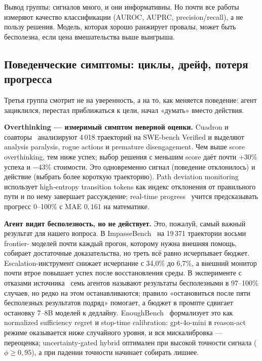 \documentclass[11pt,a4paper]{article}
\begin{document}
Вывод группы: сигналов много, и они информативны. Но почти все работы
измеряют качество классификации (AUROC, AUPRC, precision/recall), а не
пользу решения. Модель, которая хорошо ранжирует провалы, может быть
бесполезна, если цена вмешательства выше выигрыша.

\subsection{Поведенческие симптомы: циклы, дрейф, потеря прогресса}

Третья группа смотрит не на уверенность, а на то, как меняется поведение:
агент зациклился, перестал приближаться к цели, начал «думать» вместо
действия.

\textbf{Overthinking — измеримый симптом неверной оценки.}
Cuadron и соавторы~\cite{cuadron2025overthinking} анализируют 4\,018
траекторий на SWE-bench Verified и выделяют analysis paralysis, rogue
actions и premature disengagement. Чем выше score overthinking, тем ниже
успех; выбор решения с меньшим score даёт почти +30\% успеха и −43\%
стоимости. Это одновременно сигнал (поведение отклонилось) и действие
(выбрать более короткую траекторию). Path deviation
monitoring~\cite{guan2026deviation} использует high-entropy transition
tokens как индекс отклонения от правильного пути и по нему завершает
рассуждение; real-time progress~\cite{raaschou2025progress} учится
предсказывать прогресс 0--100\% с MAE $0{,}161$ на математике.

\textbf{Агент видит бесполезность, но не действует.}
Это, пожалуй, самый важный результат для нашего вопроса. В
ImpasseBench~\cite{chen2026stop} на 19\,371 траектории восьми frontier-
моделей почти каждый прогон, которому нужна внешняя помощь, собирает
достаточные доказательства, но треть всё равно исчерпывает бюджет.
Escalation-инструмент снижает исчерпание с 34{,}0\% до 6{,}7\%, а внешний
монитор почти втрое повышает успех после восстановления среды. В
эксперименте с отказами источника~\cite{zhang2026judged} семь агентов
называют результаты бесполезными в 97--100\% случаев, но редко на этом
останавливаются; правило «остановиться после пяти бесполезных результатов
подряд» помогает, а бюджет в промпте сдвигает остановку 7--8B моделей к
дедлайну. EnoughBench~\cite{almamoori2026enough} формализует это как
normalized sufficiency regret и stop-time calibration: gpt-4o-mini в
reason-act режиме оказывается ниже случайного уровня, и вся
мискалибровка — переоценка; uncertainty-gated hybrid оптимален при
высокой точности сигнала ($\phi \ge 0{,}95$), а при падении точности
начинает собирать лишнее.
\end{document}
